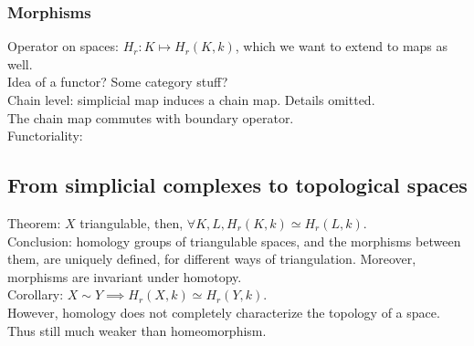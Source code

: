 \documentclass[10pt,a4paper]{report}
\begin{document}
\subsubsection{Morphisms}
Operator on spaces: $H_r:K\mapsto H_r(K,k)$, which we want to extend to maps as well.\\
Idea of a functor? Some category stuff?\\
Chain level: simplicial map induces a chain map. Details omitted.\\
The chain map commutes with boundary operator.\\
Functoriality:\\
\subsection{From simplicial complexes to topological spaces}
Theorem: $X$ triangulable, then, $\forall K,L,H_r(K,k)\simeq H_r(L,k)$.\\
Conclusion: homology groups of triangulable spaces, and the morphisms between them, are uniquely defined, for different ways of triangulation. Moreover, morphisms are invariant under homotopy.\\
Corollary: $X\sim Y\implies H_r(X,k)\simeq H_r(Y,k)$.\\
However, homology does not completely characterize the topology of a space. Thus still much weaker than homeomorphism.
\end{document}
